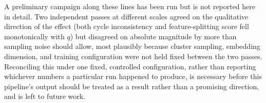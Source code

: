 \documentclass[11pt]{article}
\begin{document}
A preliminary campaign along these lines has been run but is not reported here in detail. Two independent passes at different scales agreed on the qualitative direction of the effect (both cycle inconsistency and feature-splitting score fell monotonically with $q$) but disagreed on absolute magnitude by more than sampling noise should allow, most plausibly because cluster sampling, embedding dimension, and training configuration were not held fixed between the two passes. Reconciling this under one fixed, controlled configuration, rather than reporting whichever numbers a particular run happened to produce, is necessary before this pipeline's output should be treated as a result rather than a promising direction, and is left to future work.



\end{document}
